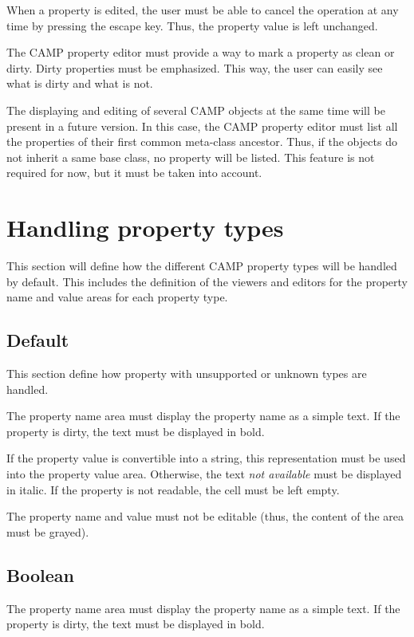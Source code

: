 \documentclass[a4paper, twoside]{report}
\begin{document}
When a property is edited, the user must be able to cancel the operation at any time by
pressing the escape key. Thus, the property value is left unchanged.

The CAMP property editor must provide a way to mark a property as clean or dirty. Dirty properties must be
emphasized. This way, the user can easily see what is dirty and what is not.

The displaying and editing of several CAMP objects at the same time will be present in a future
version. In this case, the CAMP property editor must list all the properties of their first common
meta-class ancestor. Thus, if the objects do not inherit a same base class, no property will be
listed. This feature is not required for now, but it must be taken into account.

\chapter{Handling property types\label{sec:property_types}}

This section will define how the different CAMP property types will be handled by default. This
includes the definition of the viewers and editors for the property name and value areas for each
property type.

\section{Default}

This section define how property with unsupported or unknown types are handled.

The property name area must display the property name as a simple text. If the property is dirty, the
text must be displayed in bold.

If the property value is convertible into a string, this representation must be used into the
property value area. Otherwise, the text \emph{not available} must be displayed in italic. If the
property is not readable, the cell must be left empty.

The property name and value must not be editable (thus, the content of the area must be grayed).

\section{Boolean}

The property name area must display the property name as a simple text. If the property is dirty,
the text must be displayed in bold.
\end{document}
